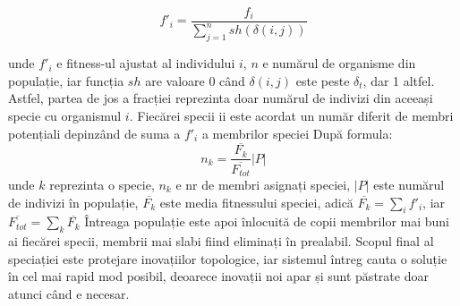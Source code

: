 \begin{equation}\label{eq:adjustedFitness}
    f\prime_i  = \frac{f_i}{\sum_{j = 1}^{n}sh(\delta(i,j))}
\end{equation}

unde $f\prime_i$ e fitness-ul ajustat al individului $i$, $n$ e numărul de organisme din populație, iar funcția $sh$ are valoare 0 când $\delta(i, j)$ este peste $\delta_t$, dar 1 altfel.
Astfel, partea de jos a fracției reprezinta doar numărul de indivizi din aceeași specie cu organismul $i$.
Fiecărei specii ii este acordat un număr diferit de membri potențiali depinzând de suma a $f\prime_i$ a membrilor speciei După formula:
\begin{equation}\label{eq:potentialMembers}
    n_k = \frac{\overline{F_k}}{\overline{F_{tot}}} |P|
\end{equation}
unde $k$ reprezinta o specie, $n_k$ e nr de membri asignați speciei, $|P|$ este numărul de indivizi în populație, $\overline{F_k}$ este media fitnessului speciei, adică $\overline{F_k} = \sum_{i}^{} f\prime_i$, iar $\overline{F_{tot}} = \sum_{k}^{} \overline{F_k}$
Întreaga populație este apoi înlocuită de copii membrilor mai buni ai fiecărei specii, membrii mai slabi fiind eliminați în prealabil.
Scopul final al speciației este protejare inovațiilor topologice, iar sistemul întreg cauta o soluție în cel mai rapid mod posibil, deoarece inovații noi apar și sunt păstrate doar atunci când e necesar.
